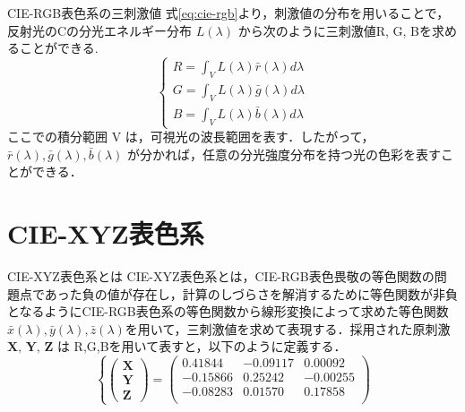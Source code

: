 \documentclass[8pt, jfont=ipaexm, t]{beamer} %
\begin{document}
\begin{frame}{CIE-RGB表色系の三刺激値}
式\eqref{eq:cie-rgb}より，刺激値の分布を用いることで，反射光のCの分光エネルギー分布
\(L(\lambda)\) から次のように三刺激値R, G, Bを求めることができる.
\begin{equation}
\left\{
\begin{aligned} 
    R = \int_V L(\lambda)\bar{r}(\lambda)d\lambda\\
    G = \int_V L(\lambda)\bar{g}(\lambda)d\lambda\\
    B = \int_V L(\lambda)\bar{b}(\lambda)d\lambda
\end{aligned}
\right.
\end{equation}
ここでの積分範囲 V
は，可視光の波長範囲を表す．したがって，\(\bar{r}(\lambda), \bar{g}(\lambda), \bar{b}(\lambda)\)
が分かれば，任意の分光強度分布を持つ光の色彩を表すことができる．
\end{frame}

\section{CIE-XYZ表色系}
\begin{frame}{CIE-XYZ表色系とは}
CIE-XYZ表色系とは，CIE-RGB表色畏敬の等色関数の問題点であった負の値が存在し，計算のしづらさを解消するために等色関数が非負となるようにCIE-RGB表色系の等色関数から線形変換によって求めた等色関数 \(\bar{x}(\lambda), \bar{y}(\lambda), \bar{z}(\lambda)\)を用いて，三刺激値を求めて表現する．採用された原刺激\(\textbf{X, Y, Z}\) は R,G,Bを用いて表すと，以下のように定義する．
\begin{equation}
\left\{
\begin{pmatrix}
\textbf{X} \\
\textbf{Y} \\
\textbf{Z}
\end{pmatrix}
=
\begin{pmatrix}
0.41844 &  -0.09117 & 0.00092 \\
-0.15866 & 0.25242 & -0.00255 \\
-0.08283 & 0.01570 & 0.17858 \\
\end{pmatrix}
\right. 
\end{equation}
\end{frame}
\end{document}

